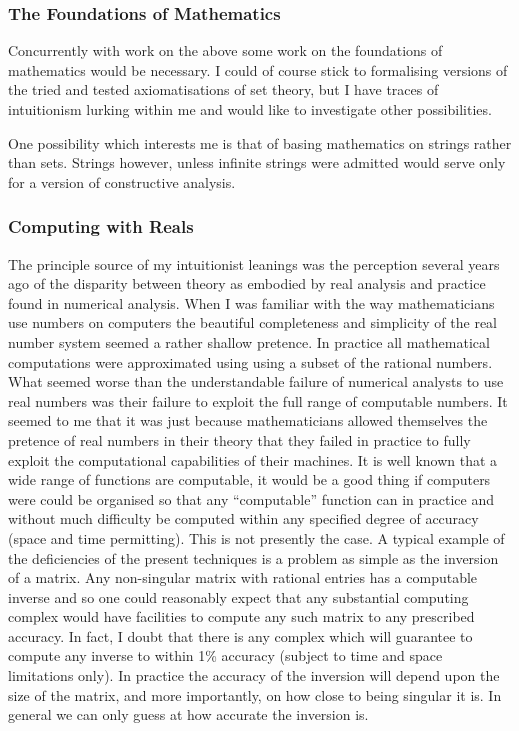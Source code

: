 \documentclass[10pt,titlepage]{book}
\begin{document}
\subsubsection{The Foundations of Mathematics}

Concurrently with work on the above some work on the foundations of mathematics would be necessary.
I could of course stick to formalising versions of the tried and tested axiomatisations of set theory, but I have traces of intuitionism lurking within me and would like to investigate other possibilities.

One possibility which interests me is that of basing mathematics on strings rather than sets. Strings however, unless infinite strings were admitted would serve only for a version of constructive analysis.

\subsubsection{Computing with Reals}

The principle source of my intuitionist leanings was the perception several years ago of the disparity between theory as embodied by real analysis and practice found in numerical analysis.
When I was familiar with the way mathematicians use numbers on computers the beautiful completeness and simplicity of the real number system seemed a rather shallow pretence.
In practice all mathematical computations were approximated using using a subset of the rational numbers.
What seemed worse than the understandable failure of numerical analysts to use real numbers was their failure to exploit the full range of computable numbers.
It seemed to me that it was just because mathematicians allowed themselves the pretence of real numbers in their theory that they failed in practice to fully exploit the computational capabilities of their machines.
It is well known that a wide range of functions are computable, it would be a good thing if computers were could be organised so that any ``computable'' function can in practice and without much difficulty be computed within any specified degree of accuracy (space and time permitting).
This is not presently the case.
A typical example of the deficiencies of the present techniques is a problem as simple as the inversion of a matrix.
Any non-singular matrix with rational entries has a computable inverse and so one could reasonably expect that any substantial computing complex would have facilities to compute any such matrix to any prescribed accuracy.
In fact, I doubt that there is any complex which will guarantee to compute any inverse to within 1\% accuracy (subject to time and space limitations only).
In practice the accuracy of the inversion will depend upon the size of the matrix, and more importantly, on how close to being singular it is.
In general we can only guess at how accurate the inversion is.
\end{document}
